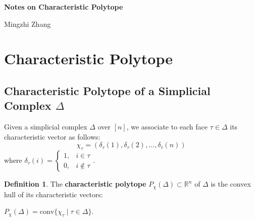 \documentclass[12pt]{article}
\theoremstyle{definition}
\newtheorem{defi}[thm]{Definition}
\numberwithin{equation}{subsection}
\begin{document}
\begin{center}
{\Large\bf 
Notes on Characteristic Polytope
}\\ [7pt]
\end{center}

\vskip 3mm

\begin{center}
Mingzhi Zhang
\end{center}

\vskip 3mm

\section{Characteristic Polytope}

\subsection{Characteristic Polytope of a Simplicial Complex $\Delta$}
Given a simplicial complex $\Delta$ over $[n]$, we associate to each face $\tau \in \Delta$ its characteristic vector as follows:
\[
\chi_{\tau} = (\delta_{\tau}(1), \delta_{\tau}(2), \ldots, \delta_{\tau}(n))
\]
where 
$\delta_{\tau}(i) = 
\begin{cases} 
1, & i \in \tau \\
0, & i \notin \tau
\end{cases}$.

\begin{defi}
    The \textbf{characteristic polytope} $P_{\chi}(\Delta) \subset \mathbb{R}^{n}$ of $\Delta$ is the convex hull of its characteristic vectors:
\begin{center}
    $P_{\chi}(\Delta) = \text{conv} \{\chi_{\tau} \mid \tau \in \Delta\}$.
\end{center}
\end{defi}
\end{document}
